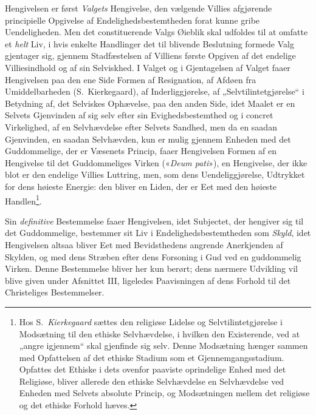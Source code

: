 Hengivelsen er først \emph{Valgets} Hengivelse, den vælgende Villies
afgjørende principielle Opgivelse af Endelighedsbestemtheden forat kunne gribe
Uendeligheden. Men det constituerende Valgs Øieblik skal udfoldes til at
omfatte et \emph{helt} Liv, i hvis enkelte Handlinger det til blivende
Beslutning formede Valg gjentager sig, gjennem Stadfæstelsen af Villiens
første Opgiven af det endelige Villiesindhold og af sin Selviskhed. I Valget
og i Gjentagelsen af Valget faaer Hengivelsen paa den ene Side Formen af
Resignation, af Afdøen fra Umiddelbarheden (S.\ Kierkegaard), af
Inderliggjørelse, af „Selvtilintetgjørelse“ i Betydning af, det Selviskes
Ophævelse, paa den anden Side, idet Maalet er en Selvets Gjenvinden af sig
selv efter sin Evighedsbestemthed og i concret Virkelighed, af en
Selvhævdelse efter Selvets
 \setcounter{footnote}{0}%
Sandhed, men da en saadan Gjenvinden, en saadan Selvhævden, kun er mulig
gjennem Enheden med det Guddommelige, der er Væsenets Princip, faaer
Hengivelsen Formen af en Hengivelse til det Guddommeliges Virken («\textit{Deum
pati}»), en Hengivelse, der ikke blot er den endelige Villies Luttring, men,
som dens Uendeliggjørelse, Udtrykket for dens høieste Energie: den bliver en
Liden, der er Eet med den høieste Handlen\footnote{Hos S.\ \emph{Kierkegaard}
sættes den religiøse Lidelse og Selvtilintetgjørelse i Modsætning til den
ethiske Selvhævdelse, i hvilken den Existerende, ved at „angre igjennem“ skal
gjenfinde sig selv. Denne Modsætning hænger sammen med Opfattelsen af det
ethiske Stadium som et Gjennemgangsstadium. Opfattes det Ethiske i dets
ovenfor paaviste oprindelige Enhed med det Religiøse, bliver allerede den
ethiske Selvhævdelse en Selvhævdelse ved Enheden med Selvets absolute Princip,
og Modsætningen mellem det religiøse og det ethiske Forhold hæves.}.

Sin \emph{definitive} Bestemmelse faaer Hengivelsen, idet Subjectet, der
hengiver sig til det Guddommelige, bestemmer sit Liv i
Endelighedsbestemtheden som \emph{Skyld}, idet Hengivelsen altsaa bliver Eet
med Bevidsthedens angrende Anerkjenden af Skylden, og med dens Stræben efter
dens Forsoning i Gud ved en guddommelig Virken. Denne Bestemmelse bliver her
kun berørt; dens nærmere Udvikling vil blive given under Afsnittet III,
ligeledes Paavisningen af dens Forhold til det Christeliges Bestemmelser.


